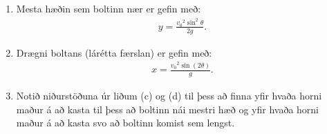 \begin{enumerate}[label = \textbf{Dæmi \thechapter.\arabic*.}]
\begin{enumerate}[label = \textbf{(\alph*)}]
    \item Mesta hæðin sem boltinn nær er gefin með:
    \begin{align*}
        y = \frac{{v_0}^2 \sin^2\theta}{2g}.
    \end{align*}
    
    \item Drægni boltans (lárétta færslan) er gefin með:
    \begin{align*}
        x = \frac{{v_0}^2 \sin(2\theta)}{g}.
    \end{align*}
    
    \item Notið niðurstöðuna úr liðum (c) og (d) til þess að finna yfir hvaða horni maður á að kasta til þess að boltinn nái mestri hæð og yfir hvaða horni maður á að kasta svo að boltinn komist sem lengst.
\end{enumerate}

\end{enumerate}

\newpage
